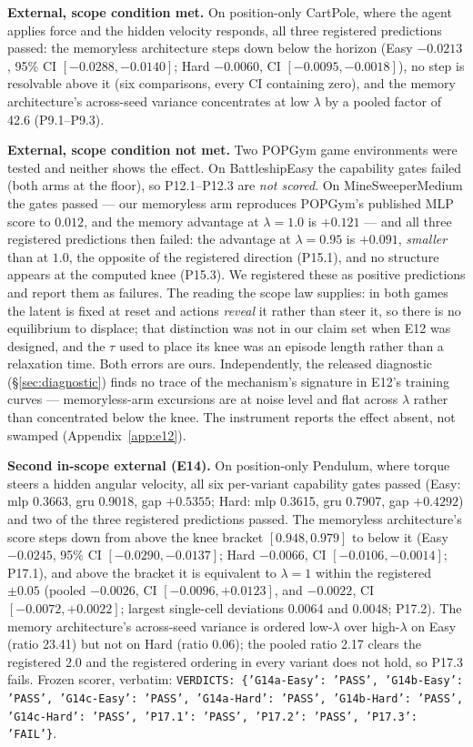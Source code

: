 \textbf{External, scope condition met.} On position-only CartPole, where
the agent applies force and the hidden velocity responds, all three
registered predictions passed: the memoryless architecture steps down
below the horizon (Easy \(-0.0213\), 95\% CI \([-0.0288, -0.0140]\);
Hard \(-0.0060\), CI \([-0.0095, -0.0018]\)), no step is resolvable
above it (six comparisons, every CI containing zero), and the memory
architecture's across-seed variance concentrates at low \(\lambda\) by a
pooled factor of 42.6 (P9.1--P9.3).

\textbf{External, scope condition not met.} Two POPGym game environments
were tested and neither shows the effect. On BattleshipEasy the capability
gates failed (both arms at the floor), so P12.1--P12.3 are \emph{not scored}.
On MineSweeperMedium the gates passed --- our memoryless arm reproduces POPGym's
published MLP score to $0.012$, and the memory advantage at $\lambda=1.0$ is
$+0.121$ --- and all three registered predictions then failed: the advantage
at $\lambda=0.95$ is $+0.091$, \emph{smaller} than at $1.0$, the opposite of
the registered direction (P15.1), and no structure appears at the computed
knee (P15.3). We registered these as positive predictions and report them as
failures. The reading the scope law supplies: in both games the latent is
fixed at reset and actions \emph{reveal} it rather than steer it, so there is
no equilibrium to displace; that distinction was not in our claim set when
E12 was designed, and the $\tau$ used to place its knee was an episode length
rather than a relaxation time. Both errors are ours. Independently, the
released diagnostic (\S\ref{sec:diagnostic}) finds no trace of the mechanism's
signature in E12's training curves --- memoryless-arm excursions are at noise
level and flat across $\lambda$ rather than concentrated below the knee. The
instrument reports the effect absent, not swamped (Appendix~\ref{app:e12}).

\textbf{Second in-scope external (E14).} On position-only Pendulum, where
torque steers a hidden angular velocity, all six per-variant capability gates
passed (Easy: mlp 0.3663, gru 0.9018, gap $+0.5355$; Hard: mlp 0.3615, gru
0.7907, gap $+0.4292$) and two of the three registered predictions passed. The
memoryless architecture's score steps down from above the knee bracket
$[0.948, 0.979]$ to below it (Easy $-0.0245$, 95\% CI $[-0.0290, -0.0137]$;
Hard $-0.0066$, CI $[-0.0106, -0.0014]$; P17.1), and above the bracket it is
equivalent to $\lambda=1$ within the registered $\pm0.05$ (pooled $-0.0026$,
CI $[-0.0096, +0.0123]$, and $-0.0022$, CI $[-0.0072, +0.0022]$; largest
single-cell deviations 0.0064 and 0.0048; P17.2). The memory architecture's
across-seed variance is ordered low-$\lambda$ over high-$\lambda$ on Easy
(ratio 23.41) but not on Hard (ratio 0.06); the pooled ratio 2.17 clears the
registered 2.0 and the registered ordering in every variant does not hold, so
P17.3 fails. Frozen scorer, verbatim: \texttt{VERDICTS: \{'G14a-Easy': 'PASS', 'G14b-Easy': 'PASS', 'G14c-Easy': 'PASS', 'G14a-Hard': 'PASS', 'G14b-Hard': 'PASS', 'G14c-Hard': 'PASS', 'P17.1': 'PASS', 'P17.2': 'PASS', 'P17.3': 'FAIL'\}}.

